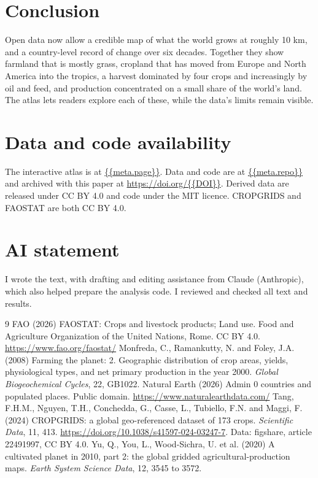 \documentclass[11pt,a4paper]{article}
\begin{document}
\section{Conclusion}
Open data now allow a credible map of what the world grows at roughly 10 km, and a country-level record of change over six decades. Together they show farmland that is mostly grass, cropland that has moved from Europe and North America into the tropics, a harvest dominated by four crops and increasingly by oil and feed, and production concentrated on a small share of the world's land. The atlas lets readers explore each of these, while the data's limits remain visible.

\section*{Data and code availability}
The interactive atlas is at \url{{{meta.page}}}. Data and code are at \url{{{meta.repo}}} and archived with this paper at \url{https://doi.org/{{DOI}}}. Derived data are released under CC BY 4.0 and code under the MIT licence. CROPGRIDS and FAOSTAT are both CC BY 4.0.

\section*{AI statement}
I wrote the text, with drafting and editing assistance from Claude (Anthropic), which also helped prepare the analysis code. I reviewed and checked all text and results.

\begin{thebibliography}{9}
 FAO (2026) FAOSTAT: Crops and livestock products; Land use. Food and Agriculture Organization of the United Nations, Rome. CC BY 4.0. \url{https://www.fao.org/faostat/}
 Monfreda, C., Ramankutty, N. and Foley, J.A. (2008) Farming the planet: 2. Geographic distribution of crop areas, yields, physiological types, and net primary production in the year 2000. \emph{Global Biogeochemical Cycles}, 22, GB1022.
 Natural Earth (2026) Admin 0 countries and populated places. Public domain. \url{https://www.naturalearthdata.com/}
 Tang, F.H.M., Nguyen, T.H., Conchedda, G., Casse, L., Tubiello, F.N. and Maggi, F. (2024) CROPGRIDS: a global geo-referenced dataset of 173 crops. \emph{Scientific Data}, 11, 413. \url{https://doi.org/10.1038/s41597-024-03247-7}. Data: figshare, article 22491997, CC BY 4.0.
 Yu, Q., You, L., Wood-Sichra, U. et al. (2020) A cultivated planet in 2010, part 2: the global gridded agricultural-production maps. \emph{Earth System Science Data}, 12, 3545 to 3572.
\end{thebibliography}
\end{document}
